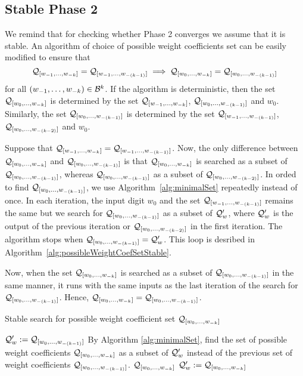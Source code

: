 \subsection*{Stable Phase 2}
We remind that for checking whether Phase 2 converges we assume that it is stable. An algorithm of choice of possible weight coefficients set can be easily modified to ensure that 
$$\Qw{1}{k}=\Qw{1}{(k-1)} \implies \Qwo{k}=\Qwo{(k-1)}$$
for all $\tuple{1}{k}\in\B^k$. If the algorithm is deterministic, then the set $\Qwo{k}$ is determined by the set $\Qw{1}{k}$, $\Qwo{(k-1)}$ and $w_0$. Similarly, the set $\Qwo{(k-1)}$ is determined by  the set $\Qw{1}{(k-1)}$, $\Qwo{(k-2)}$ and $w_0$. 

Suppose that $\Qw{1}{k}=\Qw{1}{(k-1)}$. Now, the only difference between $\Qwo{k}$ and $\Qwo{(k-1)}$ is that $\Qwo{k}$ is searched as a subset of $\Qwo{(k-1)}$, whereas $\Qwo{(k-1)}$ as a subset of $\Qwo{(k-2)}$. In orded to find  $\Qwo{(k-1)}$, we use Algorithm~\ref{alg:minimalSet} repeatedly instead of once. In each iteration, the input digit $w_0$ and the set $\Qw{1}{(k-1)}$ remains the same but we search for $\Qwo{(k-1)}$ as a subset of $\Q'_w$, where $\Q'_w$ is the output of the previous iteration or $\Qwo{(k-2)}$ in the first iteration. The algorithm stops when $\Qwo{(k-1)}=\Q'_w$. This loop is desribed in Algorithm~\ref{alg:possibleWeightCoefSetStable}.

Now, when the set $\Qwo{k}$ is searched as a subset of $\Qwo{(k-1)}$ in the same manner, it runs with the same inputs as the last iteration of the search for  $\Qwo{(k-1)}$. Hence, $\Qwo{k}=\Qwo{(k-1)}$.


\begin{algorithm}
  \caption{Stable search for possible weight coefficient set $\Qwo{k}$}
    \label{alg:possibleWeightCoefSetStable}
  \begin{algorithmic}[1]
	\STATE $\Q'_w:=\Qwo{(k-1)}$
		\STATE By Algorithm \ref{alg:minimalSet}, find the set of possible weight coefficients  $\Qwo{k}$ as a subset of $\Q'_w$ instead of the previous set of weight coefficients $\Qwo{(k-1)}$.
			\RETURN $\Qwo{k}$
		\ENDIF
		\STATE $\Q'_w:=\Qwo{k}$
	\ENDWHILE
  \end{algorithmic}
\end{algorithm}


